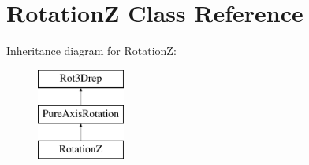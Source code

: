 \hypertarget{classRotationZ}{}\section{RotationZ Class Reference}
\label{classRotationZ}
Inheritance diagram for RotationZ\+:\begin{figure}[H]
\begin{center}
\leavevmode
\includegraphics[height=3.000000cm]{classRotationZ}
\end{center}
\end{figure}

